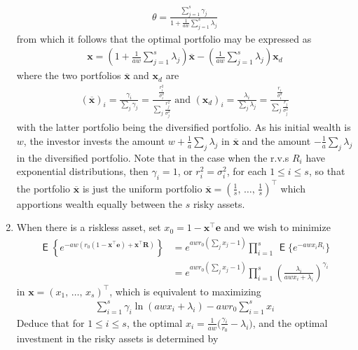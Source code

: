 \documentclass[10pt]{beamer}
\newcommand{\ds}{\displaystyle}
\DeclareMathOperator\expc{\mathsf{E}}
\theoremstyle{definition}
\begin{document}
\begin{frame}[allowframebreaks]
\begin{enumerate}
\begin{align*}
      \theta = \frac{\sum_{j=1}^s \gamma_j}{1 + \frac{1}{aw}\sum_{j=1}^s \lambda_j}
    \end{align*}
    from which it follows that the optimal portfolio may be expressed as
    \begin{align*}
      \mathbf{x} = \left(1 + \frac{1}{aw}\sum_{j=1}^s \lambda_j\right)\overline{\mathbf{x}} - \left(\frac{1}{aw}\sum_{j=1}^s \lambda_j\right)\mathbf{x}_d
    \end{align*}
    where the two portfolios $\overline{\mathbf{x}}$ and $\mathbf{x}_d$ are
    \begin{align*}
      (\overline{\mathbf{x}})_i = \frac{\gamma_i}{\sum_j\gamma_j} = \frac{\frac{r_i^2}{\sigma_i^2}}{\sum_j \frac{r_j^2}{\sigma_j^2}} \text{ and } (\mathbf{x}_d)_i = \frac{\lambda_i}{\sum_j\lambda_j} = \frac{\frac{r_i}{\sigma_i^2}}{\sum_j\frac{r_j}{\sigma_j^2}}
    \end{align*}
    with the latter portfolio being the diversified portfolio. As his initial wealth is $w$, the investor invests the amount $\ds w + \frac{1}{a}\sum_j\lambda_j$ in $\overline{\mathbf{x}}$ and the amount $\ds-\frac{1}{a}\sum_j\lambda_j$ in the diversified portfolio. Note that in the case when the r.v.s $R_i$ have exponential distributions, then $\gamma_i = 1$, or $r_i^2 = \sigma_i^2$, for each $1 \leqslant i \leqslant s$, so that the portfolio $\overline{\mathbf{x}}$ is just the uniform portfolio $\ds\overline{\mathbf{x}} = \left(\frac{1}{s},\,\ldots,\,\frac{1}{s}\right)^\top$ which apportions wealth equally between the $s$ risky assets.
    \item When there is a riskless asset, set $x_0 = 1 - \mathbf{x}^\top\mathbf{e}$ and we wish to minimize
      \begin{align*}
        \expc\left\{e^{-aw(r_0(1-\mathbf{x}^\top\mathbf{e})+\mathbf{x}^\top\mathbf{R})}\right\} &= e^{awr_0(\sum_j x_j-1)} \prod_{i=1}^s\,\expc\big\{e^{-awx_i R_i}\big\} \\ &= e^{awr_0(\sum_j x_j-1)} \prod_{i=1}^s \left(\frac{\lambda_i}{awx_i + \lambda_i}\right)^{\gamma_i}
      \end{align*}
      in $\mathbf{x} = \left(x_1,\,\ldots,\,x_s\right)^\top$, which is equivalent to maximizing
      \begin{align*}
        \sum_{i=1}^s \gamma_i\ln(awx_i + \lambda_i) - awr_0\sum_{i=1}^s x_i
      \end{align*}
      Deduce that for $1 \leqslant i \leqslant s$, the optimal $\ds x_i = \frac{1}{aw}\Big(\frac{\gamma_i}{r_0} - \lambda_i\Big)$, and the optimal investment in the risky assets is determined by

\end{enumerate}
\end{frame}
\end{document}
